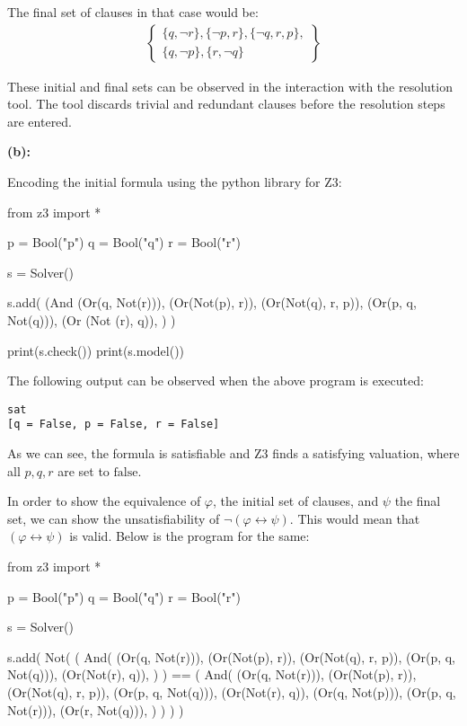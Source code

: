 \documentclass[12pt,letterpaper, onecolumn]{exam}
\begin{document}
\begin{questions}
	The final set of clauses in that case would be:
	\begin{align*}
		\left .
			\begin{cases}
				\{q, \neg r\}, \{\neg p, r\}, \{\neg q, r, p\}, \\
				\{ q, \neg p \}, \{ r, \neg q \}
			\end{cases}
		\right\}
	\end{align*}

	These initial and final sets can be observed in the interaction with the resolution tool. The tool discards trivial and redundant clauses before the resolution steps are entered.
	

	\textbf{(b):}

	Encoding the initial formula using the python library for Z3:

	\begin{python}
from z3 import *

p = Bool("p")
q = Bool("q")
r = Bool("r")

s = Solver()

s.add(
	(And 
		(Or(q, Not(r))),
		(Or(Not(p), r)),
		(Or(Not(q), r, p)), 
		(Or(p, q, Not(q))), 
		(Or (Not (r), q)),
	)
)


print(s.check())
print(s.model())
	\end{python}

	The following output can be observed when the above program is executed:
\begin{lstlisting}
sat
[q = False, p = False, r = False]
\end{lstlisting}
As we can see, the formula is satisfiable and Z3 finds a satisfying valuation, where all $p, q, r$ are set to $\text{false}$.

In order to show the equivalence of $ \varphi $, the initial set of clauses, and $ \psi $ the final set, we can show the unsatisfiability of 
$ \neg (\varphi \leftrightarrow \psi) $. This would mean that $ (\varphi \leftrightarrow \psi) $ is valid. Below is the program for the same:
\begin{python}
from z3 import *

p = Bool("p")
q = Bool("q")
r = Bool("r")

s = Solver()

s.add(
	Not(
		(
			And(
				(Or(q, Not(r))),
				(Or(Not(p), r)),
				(Or(Not(q), r, p)),
				(Or(p, q, Not(q))),
				(Or(Not(r), q)),
			)
		)
		== (
			And(
				(Or(q, Not(r))),
				(Or(Not(p), r)),
				(Or(Not(q), r, p)),
				(Or(p, q, Not(q))),
				(Or(Not(r), q)),
				(Or(q, Not(p))),
				(Or(p, q, Not(r))),
				(Or(r, Not(q))),
			)
		)
	)
)


\end{python}
\end{questions}
\end{document}
